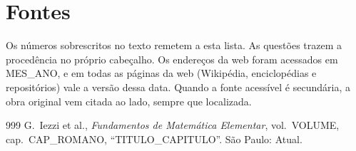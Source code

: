 \chapter*{Fontes}
\small
Os números sobrescritos no texto remetem a esta lista. As questões trazem a procedência no próprio cabeçalho. Os endereços da web foram acessados em {{MES_ANO}}, e em todas as páginas da web (Wikipédia, enciclopédias e repositórios) vale a versão dessa data. Quando a fonte acessível é secundária, a obra original vem citada ao lado, sempre que localizada.

\begingroup
\makeatletter
\renewcommand{\chapter}{\@ifstar{\@gobble}{\@gobble}}
\renewcommand{\@mkboth}[2]{}
\makeatother
\begin{thebibliography}{999}\setlength{\itemsep}{0.2em}
 G.~Iezzi et al., \emph{Fundamentos de Matemática Elementar}, vol.~{{VOLUME}}, cap.~{{CAP_ROMANO}}, \enquote{{{TITULO_CAPITULO}}}. São Paulo: Atual.
\end{thebibliography}
\endgroup

